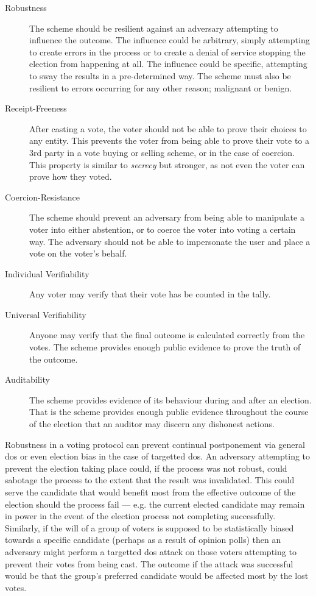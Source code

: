 \begin{description}
    \item[Robustness] The scheme should be resilient against an adversary attempting to influence the outcome. The influence could be arbitrary, simply attempting to create errors in the process or to create a denial of service stopping the election from happening at all. The influence could be specific, attempting to sway the results in a pre-determined way. The scheme must also be resilient to errors occurring for any other reason; malignant or benign.
    \item[Receipt-Freeness] After casting a vote, the voter should not be able to prove their choices to any entity. This prevents the voter from being able to prove their vote to a 3rd party in a vote buying or selling scheme, or in the case of coercion. This property is similar to \emph{secrecy} but stronger, as not even the voter can prove how they voted.
    \item[Coercion-Resistance] The scheme should prevent an adversary from being able to manipulate a voter into either abstention, or to coerce the voter into voting a certain way. The adversary should not be able to impersonate the user and place a vote on the voter's behalf.
    \item[Individual Verifiability] Any voter may verify that their vote has be counted in the tally.
    \item[Universal Verifiability] Anyone may verify that the final outcome is calculated correctly from the votes. The scheme provides enough public evidence to prove the truth of the outcome.
    \item[Auditability] The scheme provides evidence of its behaviour during and after an election. That is the scheme provides enough public evidence throughout the course of the election that an auditor may discern any dishonest actions.
\end{description}

Robustness in a voting protocol can prevent continual postponement via general \gls{dos} or even election bias in the case of targetted \gls{dos}. An adversary attempting to prevent the election taking place could, if the process was not robust, could sabotage the process to the extent that the result was invalidated. This could serve the candidate that would benefit most from the effective outcome of the election should the process fail --- e.g. the current elected candidate may remain in power in the event of the election process not completing successfully. Similarly, if the will of a group of voters is supposed to be statistically biased towards a specific candidate (perhaps as a result of opinion polls) then an adversary might perform a targetted \gls{dos} attack on those voters attempting to prevent their votes from being cast. The outcome if the attack was successful would be that the group's preferred candidate would be affected most by the lost votes.

